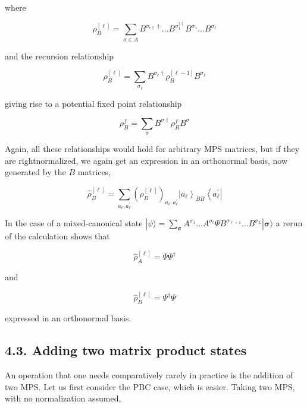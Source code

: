 \documentclass[12pt]{article}
\begin{document}
where


\begin{equation*}
\rho_{B}^{[\ell]}=\sum_{\sigma \in A} B^{\sigma_{\epsilon \dagger} \dagger} \ldots B^{\sigma_{1}^{\dagger \dagger}} B^{\sigma_{1}} \ldots B^{\sigma_{\ell}} \tag{125}
\end{equation*}


and the recursion relationship


\begin{equation*}
\rho_{B}^{[\ell]}=\sum_{\sigma_{\ell}} B^{\sigma_{\ell} \dagger} \rho_{B}^{[\ell-1]} B^{\sigma_{\ell}} \tag{126}
\end{equation*}


giving rise to a potential fixed point relationship


\begin{equation*}
\rho_{B}^{f}=\sum_{\sigma} B^{\sigma \dagger} \rho_{B}^{f} B^{\sigma} \tag{127}
\end{equation*}


Again, all these relationships would hold for arbitrary MPS matrices, but if they are rightnormalized, we again get an expression in an orthonormal basis, now generated by the $B$ matrices,


\begin{equation*}
\hat{\rho}_{B}^{[\ell]}=\sum_{a_{\ell}, a_{\ell}^{\prime}}\left(\rho_{B}^{[\ell]}\right)_{a_{\ell}, a_{\ell}^{\prime}}\left|a_{\ell}\right\rangle_{B B}\left\langle a_{\ell}^{\prime}\right| \tag{128}
\end{equation*}


In the case of a mixed-canonical state $|\psi\rangle=\sum_{\boldsymbol{\sigma}} A^{\sigma_{1}} \ldots A^{\sigma_{t}} \Psi B^{\sigma_{\ell+1}} \ldots B^{\sigma_{L}}|\boldsymbol{\sigma}\rangle$ a rerun of the calculation shows that


\begin{equation*}
\hat{\rho}_{A}^{[\ell]}=\Psi \Psi^{\dagger} \tag{129}
\end{equation*}


and


\begin{equation*}
\hat{\rho}_{B}^{[\ell]}=\Psi^{\dagger} \Psi \tag{130}
\end{equation*}


expressed in an orthonormal basis.

\subsection*{4.3. Adding two matrix product states}
An operation that one needs comparatively rarely in practice is the addition of two MPS. Let us first consider the PBC case, which is easier. Taking two MPS, with no normalization assumed,
\end{document}

